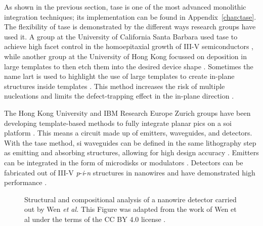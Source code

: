 As shown in the previous section, \acs{tase} is one of the most advanced monolithic integration techniques; its implementation can be found in Appendix~\ref{chap:tase}. The flexibility of \acs{tase} is demonstrated by the different ways research groups have used it. A group at the University of California Santa Barbara used \acs{tase} to achieve high facet control in the homoepitaxial growth of III-V semiconductors \cite{Brunelli2019, Goswami2020, Goswami2021}, while another group at the University of Hong Kong focussed on deposition in large templates \cite{Han2020, Yan2021} to then etch them into the desired device shape \cite{Han2020_2, Huang2024}. Sometimes the name \acf{lart} is used to highlight the use of large templates to create in-plane structures inside templates \cite{Han2020_2}. This method increases the risk of multiple nucleations and limits the defect-trapping effect in the in-plane direction \cite{Han2020, Yan2021, Huang2024}. 

The Hong Kong University and IBM Research Europe Zurich groups have been developing template-based methods to fully integrate planar \acs{pic}s on a \acs{soi} platform \cite{Mauthe2020}. This means a circuit made up of emitters, waveguides, and detectors. With the \acs{tase} method, \acl{si} waveguides can be defined in the same lithography step as emitting and absorbing structures, allowing for high design accuracy \cite{Wen2022}. Emitters can be integrated in the form of microdisks \cite{Tiwari2020, Tiwari2021} or modulators \cite{Scherrer2022, Scherrer2024}. Detectors can be fabricated out of III-V \textit{p}-\textit{i}-\textit{n} structures in nanowires and have demonstrated high performance \cite{Mauthe2020, Wen2022}.

\begin{figure}
    \centering
    \caption[Structural and compositional analysis of a nanowire detector.]{Structural and compositional analysis of a nanowire detector carried out by Wen \textit{et al.} This Figure was adapted from the work of Wen et al \cite{Wen2022} under the terms of the CC BY 4.0 license \cite{CCBY40}.}
    \label{fig:wen}
\end{figure}

